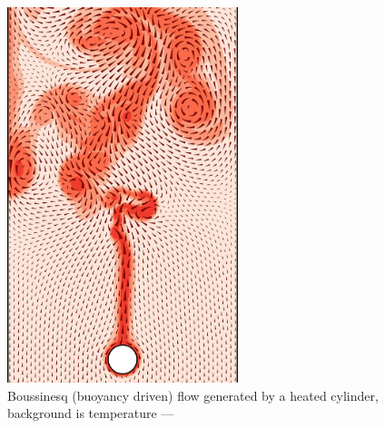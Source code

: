 \documentclass[12pt]{article}
\begin{document}
  \thispagestyle{empty}
  \begin{figure}
    \begin{center}
      \includegraphics[width=0.6\textwidth]{compose.pdf}
    \end{center}
    \caption*{Boussinesq (buoyancy driven) flow generated by a
      heated cylinder, background is temperature --- \vfplotversion}
  \end{figure}
\end{document}
